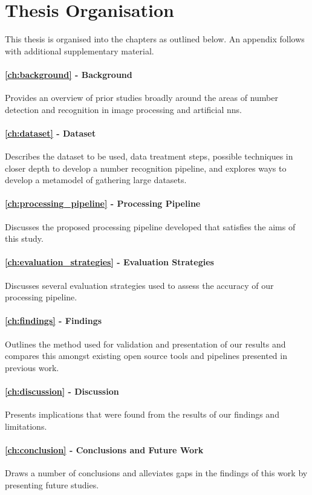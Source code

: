 \section{Thesis Organisation}
\label{sec:introduction:organisation}

This thesis is organised into the chapters as outlined below. An appendix follows with additional supplementary material.

\paragraph{\cref{ch:background} - Background} Provides an overview of prior studies broadly around the areas of number detection and recognition in image processing and artificial \glspl{nn}.

\paragraph{\cref{ch:dataset} - Dataset} Describes the dataset to be used, data treatment steps, possible techniques in closer depth to develop a number recognition pipeline, and explores ways to develop a metamodel of gathering large datasets.

\paragraph{\cref{ch:processing_pipeline} - Processing Pipeline} Discusses the proposed processing pipeline developed that satisfies the aims of this study.

\paragraph{\cref{ch:evaluation_strategies} - Evaluation Strategies} Discusses several evaluation strategies used to assess the accuracy of our processing pipeline.

\paragraph{\cref{ch:findings} - Findings} Outlines the method used for validation and presentation of our results and compares this amongst existing open source tools and pipelines presented in previous work.

\paragraph{\cref{ch:discussion} - Discussion} Presents implications that were found from the results of our findings and limitations.

\paragraph{\cref{ch:conclusion} - Conclusions and Future Work} Draws a number of conclusions and alleviates gaps in the findings of this work by presenting future studies.
